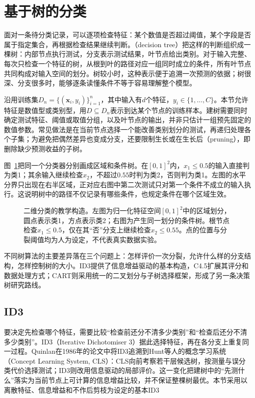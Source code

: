 \section{基于树的分类}
\label{sec:classification-trees}

面对一条待分类记录，可以逐项检查特征：某个数值是否超过阈值，某个字段是否属于指定集合，再根据检查结果继续判断。（decision tree）把这样的判断组织成一棵树：内部节点执行测试，分支表示测试结果，叶节点给出类别。对于输入完整、每次只检查一个特征的树，从根到叶的路径对应一组同时成立的条件，所有叶节点共同构成对输入空间的划分。树较小时，这种表示便于追溯一次预测的依据；树很深、分支很多时，能够逐条读懂条件不等于容易理解整个模型。

沿用训练集$D_n=\{(\bm{x}_i,y_i)\}_{i=1}^n$，其中输入有$d$个特征，$y_i\in\{1,\ldots,C\}$。本节允许特征是数值型或类别型，用$D\subseteq D_n$表示到达某个节点的训练样本。建树需要同时确定测试特征、阈值或取值分组，以及叶节点的输出，并非只估计一组预先固定的数值参数。常见做法是在当前节点选择一个能改善类别划分的测试，再递归处理各个子集；为避免把偶然差异也变成分支，还要限制生长或在生长后（pruning），即删除缺少预测收益的子树。

图~\ref{fig:classification-tree-partition}把同一个分类器分别画成区域和条件树。在$[0,1]^2$内，$x_1\leq0.5$的输入直接判为类1；其余输入继续检查$x_2$，不超过$0.55$时判为类2，否则判为类1。左图的水平分界只出现在右半区域，正对应右图中第二次测试只对第一个条件不成立的输入执行。这说明树中的路径不仅记录有哪些条件，也规定条件在哪个区域生效。

\begin{figure}[htbp]
  \centering
  
  \caption{二维分类的教学构造。左图为归一化特征空间$[0,1]^2$中的区域划分，圆点表示类1，方点表示类2；右图为产生同一划分的条件树。根节点检查$x_1\leq0.5$，仅在其“否”分支上继续检查$x_2\leq0.55$。点的位置与分裂阈值均为人为设定，不代表真实数据实验。}
  \label{fig:classification-tree-partition}
\end{figure}

不同树算法的主要差异落在三个问题上：怎样评价一次分裂，允许什么样的分支结构，怎样控制树的大小。ID3提供了信息增益驱动的基本构造，C4.5扩展其评分和数据处理方式；CART则采用统一的二叉划分与子树选择框架，形成了另一条决策树研究路线。

\subsection{ID3}
\label{sec:classification-id3}

要决定先检查哪个特征，需要比较“检查前还分不清多少类别”和“检查后还分不清多少类别”。ID3（Iterative Dichotomiser 3）据此选择特征，再在各分支上重复同一过程。Quinlan在1986年的论文中将ID3追溯到Hunt等人的概念学习系统（Concept Learning System, CLS）：CLS向前考察若干层候选树，按测量与误分类代价选择测试；ID3则改用信息驱动的局部评价。这一变化把建树中的“先测什么”落实为当前节点上可计算的信息增益比较，并不保证整棵树最优。本节采用以离散特征、信息增益和不作后剪枝为设定的基本ID3

